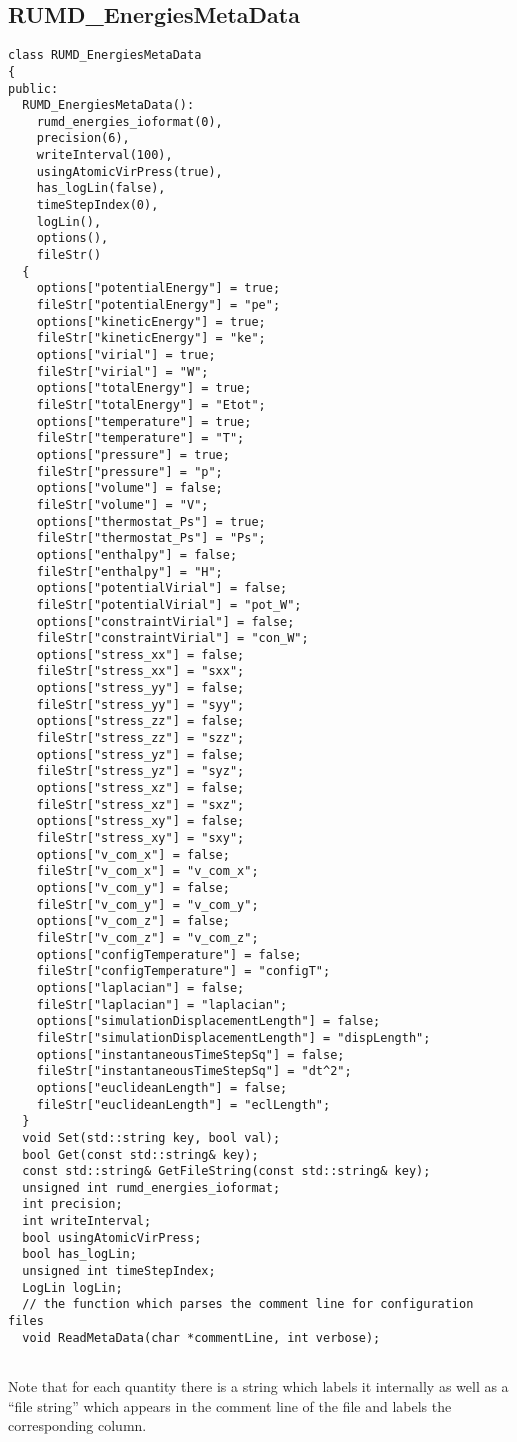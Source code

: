\documentclass[a4paper]{article}
\begin{document}
\subsection{RUMD\_EnergiesMetaData}



\begin{verbatim}
class RUMD_EnergiesMetaData
{
public:
  RUMD_EnergiesMetaData():
    rumd_energies_ioformat(0),
    precision(6),
    writeInterval(100),
    usingAtomicVirPress(true),
    has_logLin(false),
    timeStepIndex(0),
    logLin(),
    options(),
    fileStr()
  {
    options["potentialEnergy"] = true;
    fileStr["potentialEnergy"] = "pe";
    options["kineticEnergy"] = true;
    fileStr["kineticEnergy"] = "ke";
    options["virial"] = true;
    fileStr["virial"] = "W";
    options["totalEnergy"] = true;
    fileStr["totalEnergy"] = "Etot";
    options["temperature"] = true;
    fileStr["temperature"] = "T";
    options["pressure"] = true;
    fileStr["pressure"] = "p";
    options["volume"] = false;
    fileStr["volume"] = "V";
    options["thermostat_Ps"] = true;
    fileStr["thermostat_Ps"] = "Ps";
    options["enthalpy"] = false;
    fileStr["enthalpy"] = "H";
    options["potentialVirial"] = false;
    fileStr["potentialVirial"] = "pot_W";
    options["constraintVirial"] = false;
    fileStr["constraintVirial"] = "con_W";
    options["stress_xx"] = false;
    fileStr["stress_xx"] = "sxx";
    options["stress_yy"] = false;
    fileStr["stress_yy"] = "syy";
    options["stress_zz"] = false;
    fileStr["stress_zz"] = "szz";
    options["stress_yz"] = false;
    fileStr["stress_yz"] = "syz";
    options["stress_xz"] = false;
    fileStr["stress_xz"] = "sxz";
    options["stress_xy"] = false;
    fileStr["stress_xy"] = "sxy";
    options["v_com_x"] = false;
    fileStr["v_com_x"] = "v_com_x";
    options["v_com_y"] = false;
    fileStr["v_com_y"] = "v_com_y";
    options["v_com_z"] = false;
    fileStr["v_com_z"] = "v_com_z";
    options["configTemperature"] = false;
    fileStr["configTemperature"] = "configT";
    options["laplacian"] = false;
    fileStr["laplacian"] = "laplacian";
    options["simulationDisplacementLength"] = false;
    fileStr["simulationDisplacementLength"] = "dispLength";
    options["instantaneousTimeStepSq"] = false;
    fileStr["instantaneousTimeStepSq"] = "dt^2";
    options["euclideanLength"] = false;
    fileStr["euclideanLength"] = "eclLength";
  }
  void Set(std::string key, bool val);
  bool Get(const std::string& key);
  const std::string& GetFileString(const std::string& key);
  unsigned int rumd_energies_ioformat;
  int precision;
  int writeInterval;
  bool usingAtomicVirPress;
  bool has_logLin;
  unsigned int timeStepIndex;
  LogLin logLin;
  // the function which parses the comment line for configuration files         
  void ReadMetaData(char *commentLine, int verbose);


\end{verbatim}

Note that for each quantity there is a string which labels it internally as 
well as a ``file string'' which appears in the comment line of the file and
labels the corresponding column.
\end{document}
